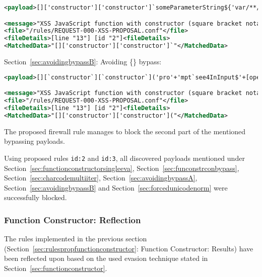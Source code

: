 \begin{lstlisting}[style=ruleStyle, language=XML, caption=avoiding () bypass blocked]
<payload>[]['constructor']['constructor']`someParameterString${'var/**/s/**/=/**/"secret";promp'+'t`s\\u{0024}{s}`'}```</payload>

<message>"XSS JavaScript function with constructor (square bracket notation)"</message>
<file>"/rules/REQUEST-000-XSS-PROPOSAL.conf"</file>
<fileDetails>[line "13"] [id "2"]<fileDetails>
<MatchedData>"[]['constructor']['constructor']`"</MatchedData>
\end{lstlisting}

Section~\ref{sec:avoidingbypassB}: Avoiding \{\} bypass:

\begin{lstlisting}[style=ruleStyle, language=XML, caption=avoiding \{\} bypass blocked]
<payload>[][`constructor`][`constructor`]('pro'+'mpt`see4InInput$'+[open+[]][0][16]+'2+2'+[open+[]][0][36]+':`')()</payload>

<message>"XSS JavaScript function with constructor (square bracket notation)"</message>
<file>"/rules/REQUEST-000-XSS-PROPOSAL.conf"</file>
<fileDetails>[line "13"] [id "2"]<fileDetails>
<MatchedData>"[]['constructor']['constructor']("</MatchedData>
\end{lstlisting}

The proposed firewall rule manages to block the second part of the mentioned bypassing payloads.

Using proposed rules \verb|id:2| and \verb|id:3|, all discovered payloads mentioned under Section~\ref{sec:functionconstructorsingleeva}, Section~\ref{sec:funconstrconbypass}, Section~\ref{sec:charcodemultiiter}, Section~\ref{sec:avoidingbypassA}, Section~\ref{sec:avoidingbypassB} and Section~\ref{sec:forcedunicodenorm} were successfully blocked.


\subsubsection{Function Constructor: Reflection}
\label{sec:rulespropfunctionconstructorreflection}
The rules implemented in the previous section (Section~\ref{sec:rulespropfunctionconstructor}: Function Constructor: Results) have been reflected upon based on the used evasion technique stated in Section~\ref{sec:functionconstructor}.

